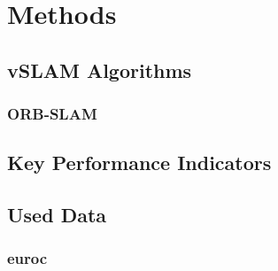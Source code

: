 \chapter{Methods}

\section{vSLAM Algorithms}

\subsection{ORB-SLAM}

\section{Key Performance Indicators}

\section{Used Data}

\subsection{euroc}

